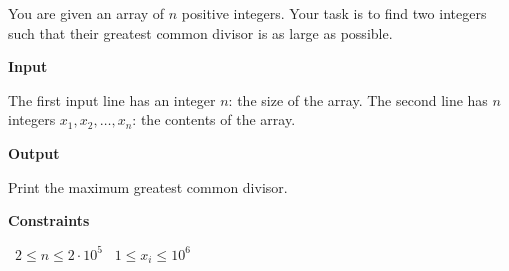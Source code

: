 You are given an array of $n$ positive integers. Your task is to find two integers such that their greatest common divisor is as large as possible.

\vspace{0.3cm}\noindent\textbf{Input}

The first input line has an integer $n$: the size of the array.
The second line has $n$ integers $x_1,x_2,\ldots,x_n$: the contents of the array.

\vspace{0.3cm}\noindent\textbf{Output}

Print the maximum greatest common divisor.

\vspace{0.3cm}\noindent\textbf{Constraints}

\textbullet\ $2 \le n \le 2 \cdot 10^5$
\textbullet\ $1 \le x_i \le 10^6$